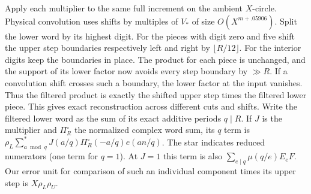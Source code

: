 \documentclass[11pt,a4paper]{article}
\theoremstyle{paperplain}
\numberwithin{equation}{section}
\begin{document}
Apply each multiplier to the same full increment on the ambient
$X$-circle. Physical convolution uses shifts by multiples of $V_*$
of size $O(X^{m+.05906})$. Split the lower word by its highest digit.
For the pieces with digit zero and five shift the upper step boundaries
respectively left and right by $\lfloor R/12\rfloor$. For the interior
digits keep the boundaries in place. The product for each piece is
unchanged, and the support of its lower factor now avoids every step
boundary by $\gg R$. If a convolution shift crosses such a boundary,
the lower factor at the input vanishes. Thus the filtered product is
exactly the shifted upper step times the filtered lower piece. This
gives exact reconstruction across different cuts and shifts. Write the
filtered lower word as the sum of its exact additive periods $q\mid R$.
If $J$ is the multiplier and $\Pi_R^\circ$ the normalized complex word
sum, its $q$ term is $\rho_L\sum_{a\bmod q}^*J(a/q)\Pi_R^\circ(-a/q)
e(an/q)$. The star indicates reduced numerators (one term for $q=1$).
At $J=1$ this term is also $\sum_{e\mid q}\mu(q/e)E_e F$.
Our error unit for comparison of such an individual component times
its upper step is $X\rho_L\rho_U$.
\end{document}
